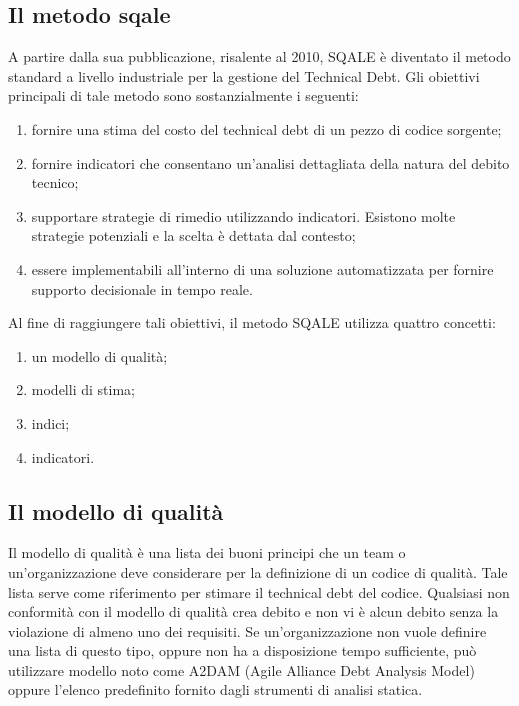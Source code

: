 \subsection{Il metodo sqale}
A partire dalla sua pubblicazione, risalente al 2010, SQALE è diventato il metodo standard a livello industriale per la gestione del Technical Debt. Gli obiettivi principali di tale metodo sono sostanzialmente i seguenti:
\begin{enumerate}
	\item fornire una stima del costo del technical debt di un pezzo di codice sorgente;
	\item fornire indicatori che consentano un'analisi  dettagliata della natura del debito tecnico;
	\item supportare strategie di rimedio utilizzando indicatori. Esistono molte strategie potenziali e la scelta è dettata dal contesto;
	\item essere implementabili all'interno di una soluzione automatizzata per fornire supporto decisionale in tempo reale.
\end{enumerate}
Al fine di raggiungere tali obiettivi, il metodo SQALE utilizza quattro concetti:
\begin{enumerate}
	\item un modello di qualità;
	\item modelli di stima;
	\item indici;
	\item indicatori.
\end{enumerate}
\subsection{Il modello di qualità}
Il modello di qualità è una lista dei buoni principi che un team o un'organizzazione deve considerare per la definizione di un codice di qualità. Tale lista serve come riferimento per stimare il technical debt del codice. Qualsiasi non conformità con il modello di qualità crea debito e non vi è alcun debito senza la violazione di almeno uno dei requisiti. Se un'organizzazione non vuole definire una lista di questo tipo, oppure non ha a disposizione tempo sufficiente, può utilizzare modello noto come A2DAM (Agile Alliance Debt Analysis Model) oppure l'elenco predefinito fornito dagli strumenti di analisi statica.
